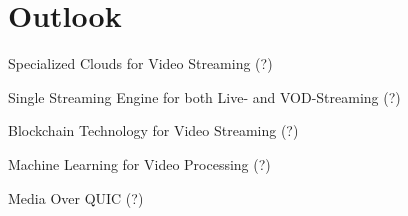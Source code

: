 
\chapter{Outlook}\label{chapter:outlook}

Specialized Clouds for Video Streaming (?)

Single Streaming Engine for both Live- and VOD-Streaming (?)

Blockchain Technology for Video Streaming (?)

Machine Learning for Video Processing (?)

Media Over QUIC (?)